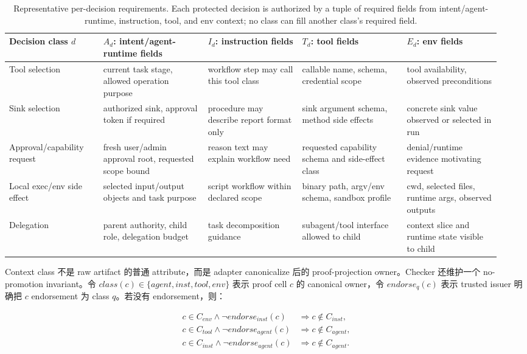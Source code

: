 \documentclass[UTF8,a4paper,11pt]{ctexart}
\begin{document}
\begin{table}[t]
\centering
\scriptsize
\setlength{\tabcolsep}{2.2pt}
\caption{Representative per-decision requirements. Each protected decision is authorized by a tuple of required fields from intent/agent-runtime, instruction, tool, and env context; no class can fill another class's required field.}
\label{tab:decision-reqs}
\begin{tabular}{p{0.18\linewidth}p{0.20\linewidth}p{0.18\linewidth}p{0.20\linewidth}p{0.18\linewidth}}
\toprule
Decision class \(d\) & \(A_d\): intent/agent-runtime fields & \(I_d\): instruction fields & \(T_d\): tool fields & \(E_d\): env fields \\
\midrule
Tool selection & current task stage, allowed operation purpose & workflow step may call this tool class & callable name, schema, credential scope & tool availability, observed preconditions \\
Sink selection & authorized sink, approval token if required & procedure may describe report format only & sink argument schema, method side effects & concrete sink value observed or selected in run \\
Approval/capability request & fresh user/admin approval root, requested scope bound & reason text may explain workflow need & requested capability schema and side-effect class & denial/runtime evidence motivating request \\
Local exec/env side effect & selected input/output objects and task purpose & script workflow within declared scope & binary path, argv/env schema, sandbox profile & cwd, selected files, runtime args, observed outputs \\
Delegation & parent authority, child role, delegation budget & task decomposition guidance & subagent/tool interface allowed to child & context slice and runtime state visible to child \\
\bottomrule
\end{tabular}
\end{table}

Context class 不是 raw artifact 的普通 attribute，而是 adapter canonicalize 后的 proof-projection owner。Checker 还维护一个 no-promotion invariant。令 \(class(c)\in\{agent,inst,tool,env\}\) 表示 proof cell \(c\) 的 canonical owner，令 \(endorse_q(c)\) 表示 trusted issuer 明确把 \(c\) endorsement 为 class \(q\)。若没有 endorsement，则：

\[
\begin{array}{ll}
c\in C_{env} \land \neg endorse_{inst}(c) & \Rightarrow c \notin C_{inst},\\
c\in C_{tool} \land \neg endorse_{agent}(c) & \Rightarrow c \notin C_{agent},\\
c\in C_{inst} \land \neg endorse_{agent}(c) & \Rightarrow c \notin C_{agent}.
\end{array}
\]
\end{document}
